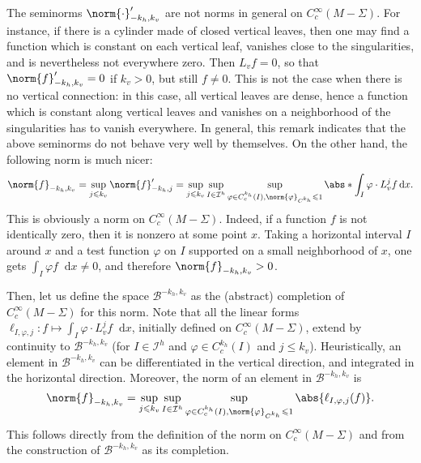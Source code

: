 \documentclass[11pt, a4paper, oneside, final, pagebackref]{amsart}
\newcommand{\boI}{\mathcal{I}}
\newcommand{\boB}{\mathcal{B}}
\newcommand{\dd}{\mathop{}\!\mathrm{d}}
\renewcommand{\phi}{\varphi}
\renewcommand{\leq}{\leqslant}
\theoremstyle{definition}
\numberwithin{equation}{section}
\begin{document}
The seminorms $\norm{\cdot}'_{-k_h, k_v}$ are not norms in general on
$C^\infty_c(M-\Sigma)$. For instance, if there is a cylinder made of closed
vertical leaves, then one may find a function which is constant on each
vertical leaf, vanishes close to the singularities, and is nevertheless not
everywhere zero. Then $L_v f= 0$, so that $\norm{f}'_{-k_h, k_v}=0$ if
$k_v>0$, but still $f \neq 0$. This is not the case when there is no vertical
connection: in this case, all vertical leaves are dense, hence a function
which is constant along vertical leaves and vanishes on a neighborhood of the
singularities has to vanish everywhere. In general, this remark indicates
that the above seminorms do not behave very well by themselves. On the other
hand, the following norm is much nicer:
\begin{equation}
\label{eq:define_norm}
  \norm{f}_{-k_h, k_v} = \sup_{j\leq k_v} \norm{f}'_{-k_h, j}
  = \sup_{j\leq k_v} \sup_{I \in \boI^h} \sup_{\phi \in C^{k_h}_c(I),
    \norm{\phi}_{C^{k_h}} \leq 1} \abs*{\int_I \phi \cdot L_v^j f \dd x}.
\end{equation}
This is obviously a norm on $C^\infty_c(M-\Sigma)$. Indeed, if a function $f$
is not identically zero, then it is nonzero at some point $x$. Taking a
horizontal interval $I$ around $x$ and a test function $\phi$ on $I$
supported on a small neighborhood of $x$, one gets $\int_I \phi f \dd x \neq
0$, and therefore $\norm{f}_{-k_h, k_v}>0$.

Then, let us define the space $\boB^{-k_h, k_v}$ as the (abstract) completion
of $C^\infty_c(M-\Sigma)$ for this norm. Note that all the linear forms
$\ell_{I, \phi,j} : f \mapsto \int_I \phi \cdot L_v^j f \dd x$, initially
defined on $C^\infty_c(M-\Sigma)$, extend by continuity to $\boB^{-k_h, k_v}$
(for $I \in \boI^h$ and $\phi \in C^{k_h}_c(I)$ and $j \leq k_v$).
Heuristically, an element in $\boB^{-k_h, k_v}$ can be differentiated in the
vertical direction, and integrated in the horizontal direction. Moreover, the
norm of an element in $\boB^{-k_h, k_v}$ is
\begin{equation}
\label{eq:norme_completion}
  \norm{f}_{-k_h, k_v}
  = \sup_{j\leq k_v} \sup_{I \in \boI^h} \sup_{\phi \in C^{k_h}_c(I),
    \norm{\phi}_{C^{k_h}} \leq 1} \abs{\ell_{I,\phi, j}(f)}.
\end{equation}
This follows directly from the definition of the norm on
$C^\infty_c(M-\Sigma)$ and from the construction of $\boB^{-k_h, k_v}$ as its
completion.
\end{document}
